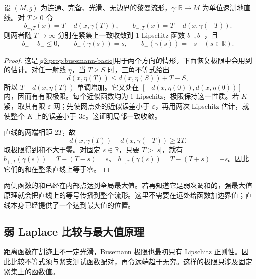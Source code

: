 \begin{lemma}\label{g3:lem:line-two-busemann-limits}
	设 \((M,g)\) 为连通、完备、光滑、无边界的黎曼流形，\(\gamma:\mathbb R\to M\) 为单位速测地直线。对 \(T\ge0\) 令
	\[
		b_{+,T}(x)=T-d(x,\gamma(T)),\qquad
		b_{-,T}(x)=T-d(x,\gamma(-T)).
	\]
	则两者随 \(T\to\infty\) 分别在紧集上一致收敛到 \(1\)-Lipschitz 函数 \(b_+,b_-\)，且
	\begin{equation}\label{g3:eq:splitting-busemann-sum}
		b_++b_-\le0,\qquad
		b_+(\gamma(s))=s,\qquad b_-(\gamma(s))=-s
		\quad(s\in\mathbb R).
	\end{equation}
\end{lemma}
\begin{proof}
	这是\cref{g3:prop:busemann-basic}用于两个方向的情形，下面恢复极限中会用到的估计。对任一射线 \(\eta\)，当 \(T\ge S\) 时，三角不等式给出
	\[
		d(x,\eta(T))\le d(x,\eta(S))+T-S,
	\]
	所以 \(T-d(x,\eta(T))\) 单调增加。它又处在 \([-d(x,\eta(0)),d(x,\eta(0))]\) 内，因而有有限极限。每个近似函数均为 \(1\)-Lipschitz，极限保持这一性质。若 \(K\) 紧，取其有限 \(\varepsilon\)-网；先使网点处的近似误差小于 \(\varepsilon\)，再用两次 Lipschitz 估计，就使整个 \(K\) 上的误差小于 \(3\varepsilon\)。这证明局部一致收敛。

	直线的两端相距 \(2T\)，故
	\[
		d(x,\gamma(T))+d(x,\gamma(-T))\ge2T.
	\]
	取极限得到和不大于零。对固定 \(s\in\mathbb R\)，只要 \(T>|s|\)，就有
	\(b_{+,T}(\gamma(s))=T-(T-s)=s\)、
	\(b_{-,T}(\gamma(s))=T-(T+s)=-s\)。因此它们的和在整条直线上等于零。
\end{proof}

两侧函数的和已经在内部点达到全局最大值。若再知道它是弱次调和的，强最大值原理就会把直线上的等号传播到整个流形。这里不需要在远处给函数加边界值；直线本身已经提供了一个达到最大值的位置。

\subsection{弱 Laplace 比较与最大值原理}
\label{g3:subsec:1505:02}
距离函数在割迹上不一定光滑，Busemann 极限也最初只有 Lipschitz 正则性。因此比较不等式须与紧支测试函数配对，再令远端趋于无穷。这样的极限只涉及固定紧集上的函数值。

